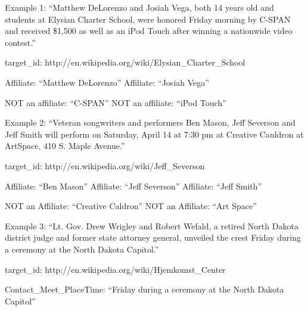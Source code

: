 \noindent Example 1: ``Matthew DeLorenzo and Josiah Vega, both 14 years old and students 
at Elysian Charter School, were honored Friday morning by C-SPAN and received 
\$1,500 as well as an iPod Touch after winning a nationwide video contest.''

target\_id:  http://en.wikipedia.org/wiki/Elysian\_Charter\_School

Affiliate:  ``Matthew DeLorenzo''
Affiliate:  ``Josiah Vega''

NOT an affiliate:  ``C-SPAN''
NOT an affiliate:  ``iPod Touch''

\noindent Example 2: ``Veteran songwriters and performers Ben Mason, Jeff Severson and 
Jeff Smith will perform on Saturday, April 14 at 7:30 pm at Creative Cauldron 
at ArtSpace, 410 S. Maple Avenue.''

target\_id: http://en.wikipedia.org/wiki/Jeff\_Severson

Affiliate: ``Ben Mason''
Affiliate: ``Jeff Severson''
Affiliate: ``Jeff Smith''

NOT an Affiliate: ``Creative Caldron''
NOT an Affiliate: ``Art Space''

\noindent Example 3:  ``Lt. Gov. Drew Wrigley and Robert Wefald, a retired North Dakota 
district judge and former state attorney general, unveiled the crest Friday 
during a ceremony at the North Dakota Capitol.''

target\_id: http://en.wikipedia.org/wiki/Hjemkomst\_Center

Contact\_Meet\_PlaceTime: ``Friday during a ceremony at the North Dakota Capitol''


 









